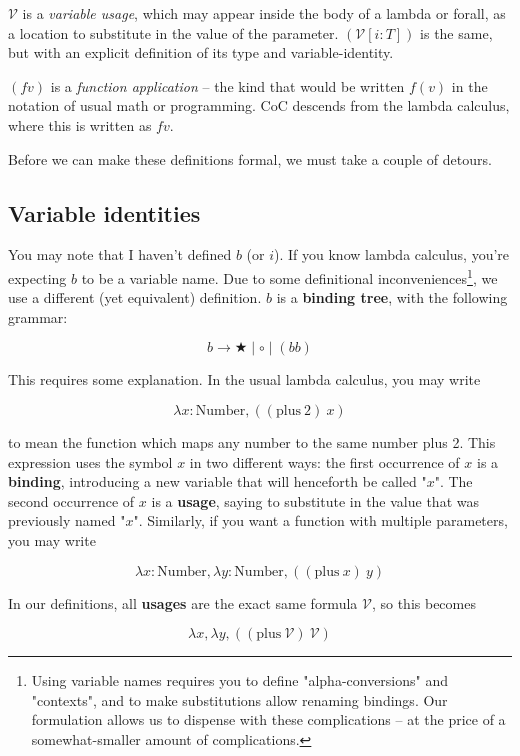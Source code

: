 \documentclass{article}
\newcommand{\usage}{\mathcal{V}}
\newcommand{\usageKnown}[2]{(\usage[#2:#1])}
\newcommand{\bindvariable}{\bigstar}
\newcommand{\bindnotthis}{\circ}
\begin{document}
  $\usage$ is a \emph{variable usage}, which may appear inside the body of a lambda or forall, as a location to substitute in the value of the parameter. $\usageKnown{T}{i}$ is the same, but with an explicit definition of its type and variable-identity.
  
  $(f v)$ is a \emph{function application} – the kind that would be written $f(v)$ in the notation of usual math or programming. CoC descends from the lambda calculus, where this is written as $f v$.
  
  Before we can make these definitions formal, we must take a couple of detours.  

  \subsection{Variable identities}

  You may note that I haven't defined $b$ (or $i$). If you know lambda calculus, you're expecting $b$ to be a variable name. Due to some definitional inconveniences\footnote{Using variable names requires you to define "alpha-conversions" and "contexts", and to make substitutions allow renaming bindings. Our formulation allows us to dispense with these complications – at the price of a somewhat-smaller amount of complications.}, we use a different (yet equivalent) definition. $b$ is a \textbf{binding tree}, with the following grammar:

  \[b \rightarrow \bindvariable \mid \bindnotthis \mid (b b) \]

  This requires some explanation. In the usual lambda calculus, you may write

  \[ \lambda x : \mathrm{Number}, ((\mathrm{plus}\ 2)\ x) \]

  to mean the function which maps any number to the same number plus 2. This expression uses the symbol $x$ in two different ways: the first occurrence of $x$ is a \textbf{binding}, introducing a new variable that will henceforth be called "$x$". The second occurrence of $x$ is a \textbf{usage}, saying to substitute in the value that was previously named "$x$". Similarly, if you want a function with multiple parameters, you may write
  
  \[ \lambda x : \mathrm{Number}, \lambda y : \mathrm{Number}, ((\mathrm{plus}\ x)\ y) \]

  In our definitions, all \textbf{usages} are the exact same formula $\usage$, so this becomes
  
  \[ \lambda x, \lambda y, ((\mathrm{plus}\ \usage)\ \usage) \]
  
\end{document}
